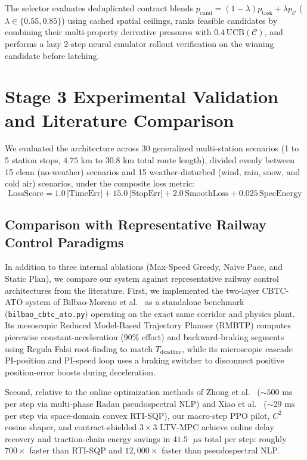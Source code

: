 \documentclass[10pt,a4paper]{article}
\begin{document}
\begin{enumerate}
\begin{equation}
        \label{eq:ucb_score}
    \end{equation}
    The selector evaluates deduplicated contract blends $p_{\text{cand}} = (1 - \lambda)p_{\text{task}} + \lambda p_{\mathcal{C}}$ ($\lambda \in \{0.55, 0.85\}$) using cached spatial ceilings, ranks feasible candidates by combining their multi-property derivative pressures with $0.4\,\text{UCB}(\mathcal{C})$, and performs a lazy 2-step neural emulator rollout verification on the winning candidate before latching.
\end{enumerate}

\section{Stage 3 Experimental Validation and Literature Comparison}

We evaluated the architecture across 30 generalized multi-station scenarios (1 to 5 station stops, $4.75\text{ km}$ to $30.8\text{ km}$ total route length), divided evenly between 15 clean (no-weather) scenarios and 15 weather-disturbed (wind, rain, snow, and cold air) scenarios, under the composite loss metric:
\begin{equation}
    \text{LossScore} = 1.0\,|\text{TimeErr}| + 15.0\,|\text{StopErr}| + 2.0\,\text{SmoothLoss} + 0.025\,\text{SpecEnergy}
\end{equation}

\subsection{Comparison with Representative Railway Control Paradigms}
In addition to three internal ablations (Max-Speed Greedy, Naive Pace, and Static Plan), we compare our system against representative railway control architectures from the literature. First, we implemented the two-layer CBTC-ATO system of Bilbao-Moreno et al.\ \cite{bilbao2025} as a standalone benchmark (\texttt{bilbao\_cbtc\_ato.py}) operating on the exact same corridor and physics plant. Its mesoscopic Reduced Model-Based Trajectory Planner (RMBTP) computes piecewise constant-acceleration ($90\%$ effort) and backward-braking segments using Regula Falsi root-finding to match $T_{\text{deadline}}$, while its microscopic cascade PI-position and PI-speed loop uses a braking switcher to disconnect positive position-error boosts during deceleration.

Second, relative to the online optimization methods of Zhong et al.\ \cite{zhong2022} ($\sim 500\text{ ms}$ per step via multi-phase Radau pseudospectral NLP) and Xiao et al.\ \cite{xiao2023} ($\sim 29\text{ ms}$ per step via space-domain convex RTI-SQP), our macro-step PPO pilot, $C^2$ cosine shaper, and contract-shielded $3\times 3$ LTV-MPC achieve online delay recovery and traction-chain energy savings in $41.5\text{ }\mu\text{s}$ total per step: roughly $700\times$ faster than RTI-SQP and $12,000\times$ faster than pseudospectral NLP.
\end{document}
